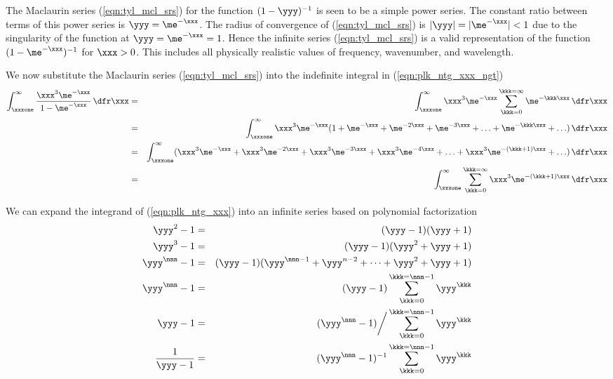 \documentclass[12pt]{article}
\begin{document}
The Maclaurin series (\ref{eqn:tyl_mcl_srs}) for the function $(1 - \yyy)^{-1}$ is seen to be a simple power series.
The constant ratio between terms of this power series is $\yyy = \me^{-\xxx}$.
The radius of convergence of (\ref{eqn:tyl_mcl_srs}) is $|\yyy| = |\me^{-\xxx}| < 1$ due to the singularity of the function at $\yyy = \me^{-\xxx} = 1$.
Hence the infinite series (\ref{eqn:tyl_mcl_srs}) is a valid representation of the function $(1 - \me^{-\xxx})^{-1}$ for $\xxx > 0$.
This includes all physically realistic values of frequency, wavenumber, and wavelength.

We now substitute the Maclaurin series (\ref{eqn:tyl_mcl_srs}) into 
the indefinite integral in (\ref{eqn:plk_ntg_xxx_ngt})
\begin{eqnarray}
\int_{\xxxone}^{\infty} 
\frac{\xxx^{3}\me^{-\xxx}}{1 - \me^{-\xxx}} \,\dfr\xxx
& = &
\int_{\xxxone}^{\infty} \xxx^{3}\me^{-\xxx} \sum_{\kkk=0}^{\kkk=\infty} \me^{-\kkk\xxx} \,\dfr\xxx \nonumber \\
& = &
\int_{\xxxone}^{\infty} \xxx^{3}\me^{-\xxx} ( 1 + \me^{-\xxx} + \me^{-2\xxx} + \me^{-3\xxx} + \ldots + \me^{-\kkk\xxx} + \ldots ) \,\dfr\xxx \nonumber \\
& = &
\int_{\xxxone}^{\infty} ( \xxx^{3}\me^{-\xxx} + \xxx^{3}\me^{-2\xxx} + \xxx^{3}\me^{-3\xxx} + \xxx^{3}\me^{-4\xxx} + \ldots + \xxx^{3}\me^{-(\kkk+1)\xxx} + \ldots ) \,\dfr\xxx \nonumber \\
& = &
\int_{\xxxone}^{\infty} \sum_{\kkk=0}^{\kkk=\infty} \xxx^{3}\me^{-(\kkk+1)\xxx} \,\dfr\xxx  
\label{eqn:tyl_mcl_new}
\end{eqnarray}

We can expand the integrand of (\ref{eqn:plk_ntg_xxx}) into an
infinite series based on polynomial factorization
\begin{eqnarray}
\yyy^{2} - 1 & = & (\yyy - 1)(\yyy + 1) \nonumber \\
\yyy^{3} - 1 & = & (\yyy - 1)(\yyy^{2} + \yyy + 1) \nonumber \\
\yyy^{\nnn} - 1 & = & (\yyy - 1)(\yyy^{\nnn-1} + \yyy^{n-2} + \cdots + \yyy^{2} + \yyy + 1) \nonumber \\
\yyy^{\nnn} - 1 & = & (\yyy - 1) \sum_{\kkk=0}^{\kkk=\nnn-1} \yyy^{\kkk} \nonumber \\
\yyy - 1 & = & (\yyy^{\nnn} - 1) \bigg/ \sum_{\kkk=0}^{\kkk=\nnn-1} \yyy^{\kkk} \nonumber \\
\frac{1}{\yyy - 1} & = & (\yyy^{\nnn} - 1)^{-1} \sum_{\kkk=0}^{\kkk=\nnn-1} \yyy^{\kkk}
\label{eqn:ply_fct_srs}
\end{eqnarray}
\end{document}
